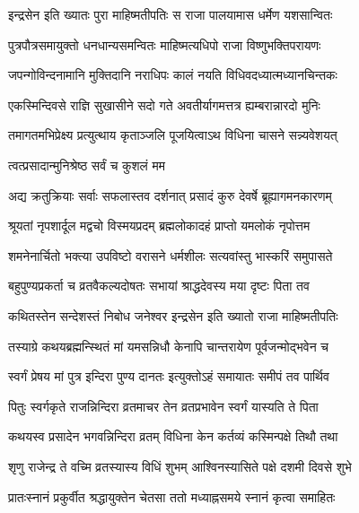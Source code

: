 \twolineshloka
{इन्द्रसेन इति ख्यातः पुरा माहिष्मतीपतिः}
{स राजा पालयामास धर्मेण यशसान्वितः}%

\twolineshloka
{पुत्रपौत्रसमायुक्तो धनधान्यसमन्वितः}
{माहिष्मत्यधिपो राजा विष्णुभक्तिपरायणः}%

\twolineshloka
{जपन्गोविन्दनामानि मुक्तिदानि नराधिपः}
{कालं नयति विधिवदध्यात्मध्यानचिन्तकः}%

\twolineshloka
{एकस्मिन्दिवसे राज्ञि सुखासीने सदो गते}
{अवतीर्यागमत्तत्र ह्यम्बरान्नारदो मुनिः}%

\twolineshloka
{तमागतमभिप्रेक्ष्य प्रत्युत्थाय कृताञ्जलि}
{पूजयित्वाऽथ विधिना चासने सन्न्यवेशयत्}%

\onelineshloka
{त्वत्प्रसादान्मुनिश्रेष्ठ सर्वं च कुशलं मम}%

\twolineshloka
{अद्य क्रतुक्रियाः सर्वाः सफलास्तव दर्शनात्}
{प्रसादं कुरु देवर्षे ब्रूह्यागमनकारणम्}%


\twolineshloka
{श्रूयतां नृपशार्दूल मद्वचो विस्मयप्रदम्}
{ब्रह्मलोकादहं प्राप्तो यमलोकं नृपोत्तम}%

\twolineshloka
{शमनेनार्चितो भक्त्या उपविष्टो वरासने}
{धर्मशीलः सत्यवांस्तु भास्करिं समुपासते}%

\twolineshloka
{बहुपुण्यप्रकर्ता च व्रतवैकल्यदोषतः}
{सभायां श्राद्धदेवस्य मया दृष्टः पिता तव}%

\twolineshloka
{कथितस्तेन सन्देशस्तं निबोध जनेश्वर}
{इन्द्रसेन इति ख्यातो राजा माहिष्मतीपतिः}%

\twolineshloka
{तस्याग्रे कथयब्रह्मन्स्थितं मां यमसन्निधौ}
{केनापि चान्तरायेण पूर्वजन्मोद्भवेन च}%

\twolineshloka
{स्वर्गं प्रेषय मां पुत्र इन्दिरा पुण्य दानतः}
{इत्युक्तोऽहं समायातः समीपं तव पार्थिव}%

\twolineshloka
{पितुः स्वर्गकृते राजन्निन्दिरा व्रतमाचर}
{तेन व्रतप्रभावेन स्वर्गं यास्यति ते पिता}%


\twolineshloka
{कथयस्व प्रसादेन भगवन्निन्दिरा व्रतम्}
{विधिना केन कर्तव्यं कस्मिन्पक्षे तिथौ तथा}%


\twolineshloka
{शृणु राजेन्द्र ते वच्मि व्रतस्यास्य विधिं शुभम्}
{आश्विनस्यासिते पक्षे दशमी दिवसे शुभे}%

\twolineshloka
{प्रातःस्नानं प्रकुर्वीत श्रद्धायुक्तेन चेतसा}
{ततो मध्याह्नसमये स्नानं कृत्वा समाहितः}%

